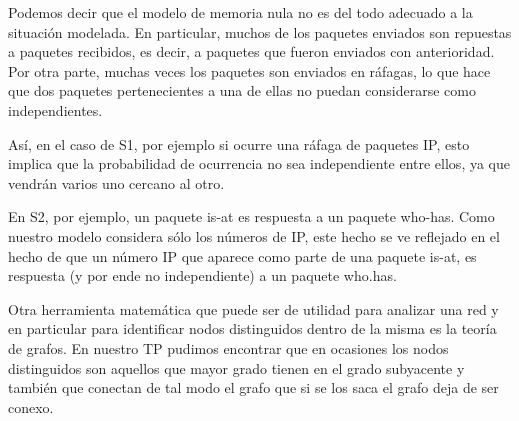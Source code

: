 
Podemos decir que el modelo de memoria nula no es del todo adecuado a
la situación modelada. En particular, muchos de los paquetes enviados
son repuestas a paquetes recibidos, es decir, a paquetes que fueron
enviados con anterioridad. Por otra parte, muchas veces los paquetes
son enviados en ráfagas, lo que hace que dos paquetes pertenecientes a
una de ellas no puedan considerarse como independientes.

Así, en el caso de S1, por ejemplo si ocurre una ráfaga de paquetes IP,
esto implica que la probabilidad de ocurrencia no sea independiente entre
ellos, ya que vendrán varios uno cercano al otro.

En S2, por ejemplo, un paquete is-at es respuesta a un paquete
who-has. Como nuestro modelo considera sólo los números de IP, este
hecho se ve reflejado en el hecho de que un número IP que aparece como
parte de una paquete is-at, es respuesta (y por ende no independiente)
a un paquete who.has.


Otra herramienta matemática que puede ser de utilidad para analizar
una red y en particular para identificar nodos distinguidos dentro de
la misma es la teoría de grafos. En nuestro TP pudimos encontrar que
en ocasiones los nodos distinguidos son aquellos que mayor grado tienen
en el grado subyacente y también que conectan de tal modo el grafo que
si se los saca el grafo deja de ser conexo.
